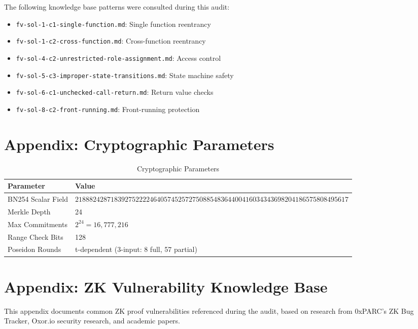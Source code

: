 \documentclass[11pt,a4paper]{article}
\begin{document}
The following knowledge base patterns were consulted during this audit:

\begin{itemize}
    \item \texttt{fv-sol-1-c1-single-function.md}: Single function reentrancy
    \item \texttt{fv-sol-1-c2-cross-function.md}: Cross-function reentrancy
    \item \texttt{fv-sol-4-c2-unrestricted-role-assignment.md}: Access control
    \item \texttt{fv-sol-5-c3-improper-state-transitions.md}: State machine safety
    \item \texttt{fv-sol-6-c1-unchecked-call-return.md}: Return value checks
    \item \texttt{fv-sol-8-c2-front-running.md}: Front-running protection
\end{itemize}

\section{Appendix: Cryptographic Parameters}

\begin{table}[H]
\centering
\begin{tabular}{|l|l|}
\hline
\textbf{Parameter} & \textbf{Value} \\
\hline
BN254 Scalar Field & $21888242871839275222246405745257275088548364400416034343698204186575808495617$ \\
Merkle Depth & 24 \\
Max Commitments & $2^{24} = 16,777,216$ \\
Range Check Bits & 128 \\
Poseidon Rounds & t-dependent (3-input: 8 full, 57 partial) \\
\hline
\end{tabular}
\caption{Cryptographic Parameters}
\end{table}

\section{Appendix: ZK Vulnerability Knowledge Base}

This appendix documents common ZK proof vulnerabilities referenced during the audit, based on research from 0xPARC's ZK Bug Tracker, Oxor.io security research, and academic papers.
\end{document}
